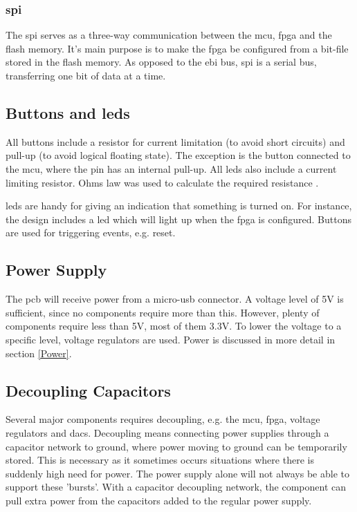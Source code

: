 \subsubsection{\gls{spi}}
The \gls{spi} serves as a three-way communication between the \gls{mcu}, \gls{fpga} and the flash memory.
It's main purpose is to make the \gls{fpga} be configured from a bit-file stored in the flash memory.
As opposed to the \gls{ebi} bus, \gls{spi} is a serial bus, transferring one bit of data at a time.

\subsection{Buttons and \gls{led}s}
All buttons include a resistor for current limitation (to avoid short circuits) and pull-up (to avoid logical floating state).
The exception is the button connected to the \gls{mcu}, where the pin has an internal pull-up.
All \gls{led}s also include a current limiting resistor.
Ohms law was used to calculate the required resistance \cite{ohm}.

\gls{led}s are handy for giving an indication that something is turned on.
For instance, the design includes a \gls{led} which will light up when the \gls{fpga} is configured.
Buttons are used for triggering events, e.g. reset.

\subsection{Power Supply}
The \gls{pcb} will receive power from a micro-\gls{usb} connector.
A voltage level of 5V is sufficient, since no components require more than this.
However, plenty of components require less than 5V, most of them 3.3V.
To lower the voltage to a specific level, voltage regulators are used.
Power is discussed in more detail in section \ref{Power}.

\subsection{Decoupling Capacitors}
Several major components requires decoupling, e.g. the \gls{mcu}, \gls{fpga}, voltage regulators and \gls{dac}s.
Decoupling means connecting power supplies through a capacitor network to ground, where power moving to ground can be temporarily stored.
This is necessary as it sometimes occurs situations where there is suddenly high need for power.
The power supply alone will not always be able to support these 'bursts'.
With a capacitor decoupling network, the component can pull extra power from the capacitors added to the regular power supply.

